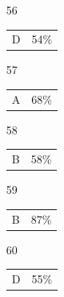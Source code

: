 \documentclass[12pt]{article}
\begin{document}
\begin{multicols}{5}
\begin{enumerate}
\item[]
\item[56] \begin{tabular}{cc} D & 54\%\end{tabular}
\item[57] \begin{tabular}{cc} A & 68\%\end{tabular}
\item[58] \begin{tabular}{cc} B & 58\%\end{tabular}
\item[59] \begin{tabular}{cc} B & 87\%\end{tabular}
\item[60] \begin{tabular}{cc} D & 55\%\end{tabular}

\item[]


\end{enumerate}
\end{multicols}
\end{document}
